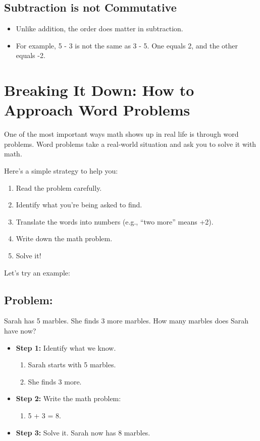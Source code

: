 \subsection{Subtraction is not Commutative}
\begin{itemize}
    \item Unlike addition, the order does matter in subtraction.
    \item For example, 5 - 3 is not the same as 3 - 5. One equals 2, and the other equals -2.
\end{itemize}

\section{Breaking It Down: How to Approach Word Problems}
One of the most important ways math shows up in real life is through word problems. Word problems take a real-world situation and ask you to solve it with math.

Here’s a simple strategy to help you:
\begin{enumerate}
    \item Read the problem carefully.
    \item Identify what you’re being asked to find.
    \item Translate the words into numbers (e.g., “two more” means +2).
    \item Write down the math problem.
    \item Solve it!
\end{enumerate}

Let’s try an example:
\subsection{\textbf{Problem:}}
 Sarah has 5 marbles. She finds 3 more marbles. How many marbles does Sarah have now?
\begin{itemize}
  
    \item \textbf{Step 1:} Identify what we know.
    \begin{enumerate}[label=\alph*)]
        \item Sarah starts with 5 marbles.
        \item She finds 3 more.
    \end{enumerate}
    \item \textbf{Step 2:} Write the math problem:
    \begin{enumerate}[label=\alph*)]
        \item 5 + 3 = 8.
    \end{enumerate}
    \item \textbf{Step 3:} Solve it. Sarah now has 8 marbles.
\end{itemize}

